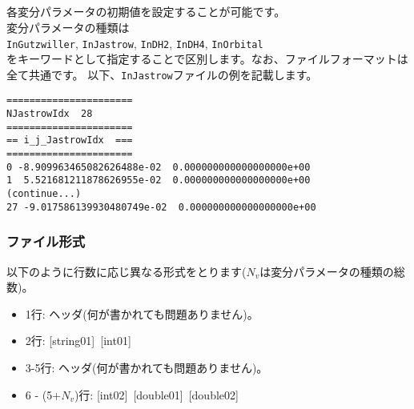 \newpage
\subsection{}
\label{Subsec:InputParam}
各変分パラメータの初期値を設定することが可能です。\\
変分パラメータの種類は\\
\verb|InGutzwiller|, \verb|InJastrow|, \verb|InDH2|, \verb|InDH4|, \verb|InOrbital|\\
をキーワードとして指定することで区別します。なお、ファイルフォーマットは全て共通です。
以下、\verb|InJastrow|ファイルの例を記載します。

\begin{minipage}{12.5cm}
\begin{screen}
\begin{verbatim}
======================
NJastrowIdx  28
====================== 
== i_j_JastrowIdx  ===
====================== 
0 -8.909963465082626488e-02  0.000000000000000000e+00
1  5.521681211878626955e-02  0.000000000000000000e+00
(continue...)
27 -9.017586139930480749e-02  0.000000000000000000e+00
\end{verbatim}
\end{screen}
\end{minipage}

\subsubsection{ファイル形式}
以下のように行数に応じ異なる形式をとります($N_v$は変分パラメータの種類の総数)。
 \begin{itemize}
   \item  1行:  ヘッダ(何が書かれても問題ありません)。
   \item  2行:   [string01]~[int01]
   \item  3-5行:  ヘッダ(何が書かれても問題ありません)。
   \item  6 - (5+$N_v$)行: [int02]~[double01]~[double02]
  \end{itemize}
